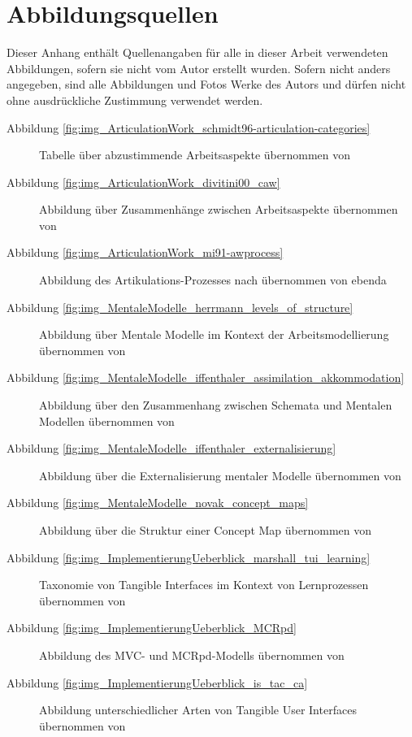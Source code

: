\chapter*{Abbildungsquellen}

Dieser Anhang enthält Quellenangaben für alle in dieser Arbeit verwendeten Abbildungen, sofern sie nicht vom Autor erstellt wurden. Sofern nicht anders angegeben, sind alle Abbildungen und Fotos Werke des Autors und dürfen nicht ohne ausdrückliche Zustimmung verwendet werden.

\begin{description}
 \item[Abbildung \ref{fig:img_ArticulationWork_schmidt96-articulation-categories}] Tabelle über abzustimmende Arbeitsaspekte übernommen von \citep{Schmidt96}
 \item[Abbildung \ref{fig:img_ArticulationWork_divitini00_caw}] Abbildung über Zusammenhänge zwischen Arbeitsaspekte übernommen von \citep{Divitini00}
 \item[Abbildung \ref{fig:img_ArticulationWork_mi91-awprocess}] Abbildung des Artikulations-Prozesses nach \citep{Mi91} übernommen von ebenda
 \item[Abbildung \ref{fig:img_MentaleModelle_herrmann_levels_of_structure}] Abbildung über Mentale Modelle im Kontext der Arbeitsmodellierung übernommen von \citep{Herrmann02}
 \item[Abbildung \ref{fig:img_MentaleModelle_iffenthaler_assimilation_akkommodation}] Abbildung über den Zusammenhang zwischen Schemata und Mentalen Modellen übernommen von \citep{Ifenthaler06}
 \item[Abbildung \ref{fig:img_MentaleModelle_iffenthaler_externalisierung}] Abbildung über die Externalisierung mentaler Modelle übernommen von \citep{Ifenthaler06}
 \item[Abbildung \ref{fig:img_MentaleModelle_novak_concept_maps}] Abbildung über die Struktur einer Concept Map übernommen von \citep{Novak06}
 \item[Abbildung \ref{fig:img_ImplementierungUeberblick_marshall_tui_learning}] Taxonomie von Tangible Interfaces im Kontext von Lernprozessen übernommen von \citep{Marshall07}
 \item[Abbildung \ref{fig:img_ImplementierungUeberblick_MCRpd}] Abbildung des MVC- und MCRpd-Modells übernommen von \citep{Ullmer00}
 \item[Abbildung \ref{fig:img_ImplementierungUeberblick_is_tac_ca} ] Abbildung unterschiedlicher Arten von Tangible User Interfaces übernommen von \citep{Ullmer05}

\end{description}

